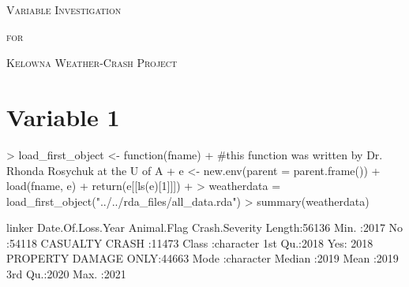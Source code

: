 \documentclass[11pt, a4paper]{article}
\begin{document}


\begin{center}
\Large{\textsc{Variable Investigation}}
\par
\normalsize{\textsc{for}}
\par
\large{\textsc{Kelowna Weather-Crash Project}}
\end{center}


\vspace{0.917 pc} %

\section*{Variable 1}




\begin{Schunk}
\begin{Sinput}
> load_first_object <- function(fname){
+   #this function was written by Dr. Rhonda Rosychuk at the U of A 
+   e <- new.env(parent = parent.frame())
+   load(fname, e)
+   return(e[[ls(e)[1]]])
+ }
> weatherdata = load_first_object("../../rda_files/all_data.rda")
> summary(weatherdata)
\end{Sinput}
\begin{Soutput}
    linker          Date.Of.Loss.Year Animal.Flag              Crash.Severity 
 Length:56136       Min.   :2017      No :54118   CASUALTY CRASH      :11473  
 Class :character   1st Qu.:2018      Yes: 2018   PROPERTY DAMAGE ONLY:44663  
 Mode  :character   Median :2019                                              
                    Mean   :2019                                              
                    3rd Qu.:2020                                              
                    Max.   :2021                                              
                                                                              

\end{Soutput}
\end{Schunk}
\end{document}
